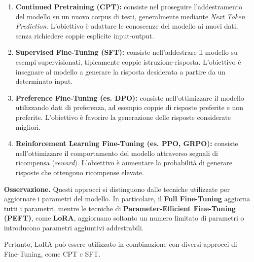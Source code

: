 \begin{enumerate}
    \item \textbf{Continued Pretraining (CPT):}
    consiste nel proseguire l'addestramento del modello
    su un nuovo corpus di testi, generalmente mediante
    \textit{Next Token Prediction}. L'obiettivo è adattare
    le conoscenze del modello ai nuovi dati, senza
    richiedere coppie esplicite input-output.

    \item \textbf{Supervised Fine-Tuning (SFT):}
    consiste nell'addestrare il modello su esempi
    supervisionati, tipicamente coppie istruzione-risposta.
    L'obiettivo è insegnare al modello a generare
    la risposta desiderata a partire da un determinato input.

    \item \textbf{Preference Fine-Tuning (es. DPO):}
    consiste nell'ottimizzare il modello utilizzando
    dati di preferenza, ad esempio coppie di risposte
    preferite e non preferite. L'obiettivo è favorire
    la generazione delle risposte considerate migliori.

    \item \textbf{Reinforcement Learning Fine-Tuning
    (es. PPO, GRPO):}
    consiste nell'ottimizzare il comportamento del modello
    attraverso segnali di ricompensa (\textit{reward}).
    L'obiettivo è aumentare la probabilità di generare
    risposte che ottengono ricompense elevate.
\end{enumerate}

\noindent
\textbf{Osservazione.}
Questi approcci si distinguono dalle tecniche utilizzate
per aggiornare i parametri del modello. In particolare,
il \textbf{Full Fine-Tuning} aggiorna tutti i parametri,
mentre le tecniche di \textbf{Parameter-Efficient Fine-Tuning
(PEFT)}, come \textbf{LoRA}, aggiornano soltanto un numero
limitato di parametri o introducono parametri aggiuntivi
addestrabili.

Pertanto, LoRA può essere utilizzato in combinazione
con diversi approcci di Fine-Tuning, come CPT e SFT.

